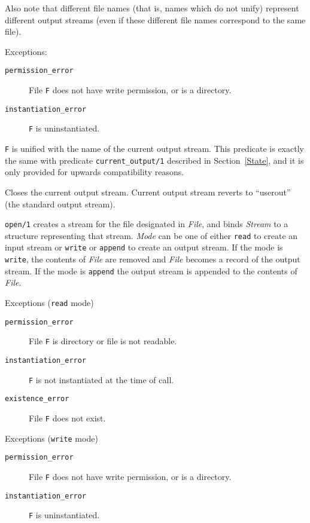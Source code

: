 \begin{description}
    Also note that different file names (that is, names which do not unify) 
    represent different output streams (even if these different file names 
    correspond to the same file).

    Exceptions:
    \begin {description}
    \item[{\tt permission\_error}]
	File {\tt F} does not have write permission, or is a directory.
    \item[{\tt instantiation\_error}]
	{\tt F} is uninstantiated.
    \end{description}

    {\tt F} is unified with the name of the current output stream.
    This predicate is exactly the same with predicate {\tt current\_output/1}
    described in Section~\ref{State}, and it is only provided for
    upwards compatibility reasons.

    Closes the current output stream. 
    Current output stream reverts to ``userout'' (the standard output stream).

    {\tt open/1} creates a stream for the file designated in {\em
    File}, and binds {\em Stream} to a structure representing that
    stream.  {\em Mode} can be one of either {\tt read} to create an
    input stream or {\tt write} or {\tt append} to create an output
    stream.  If the mode is {\tt write}, the contents of {\em File}
    are removed and {\em File} becomes a record of the output stream.
    If the mode is {\tt append} the output stream is appended to the
    contents of {\em File}.

    Exceptions ({\tt read} mode)
    \begin{description}
    \item[{\tt permission\_error}]
    	File {\tt F} is directory or file is not readable. 
    \item[{\tt instantiation\_error}]
    	{\tt F} is not instantiated at the time of call. 
    \item[{\tt existence\_error}]
    	File {\tt F} does not exist. 
    \end{description}

    Exceptions ({\tt write} mode)
    \begin {description}
    \item[{\tt permission\_error}]
	File {\tt F} does not have write permission, or is a directory.
    \item[{\tt instantiation\_error}]
	{\tt F} is uninstantiated.
    \end{description}


\end{description}

